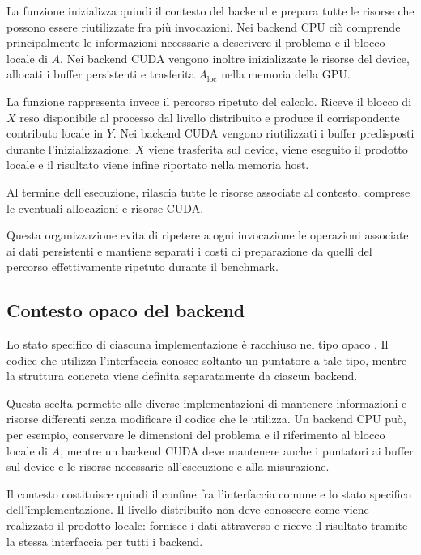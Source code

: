 La funzione  inizializza quindi il contesto del
backend e prepara tutte le risorse che possono essere riutilizzate fra più
invocazioni. Nei backend CPU ciò comprende principalmente le informazioni
necessarie a descrivere il problema e il blocco locale di $A$. Nei backend
CUDA vengono inoltre inizializzate le risorse del device, allocati i buffer
persistenti e trasferita $A_{\mathrm{loc}}$ nella memoria della GPU.

La funzione  rappresenta invece il percorso ripetuto del
calcolo. Riceve il blocco di $X$ reso disponibile al processo dal livello
distribuito e produce il corrispondente contributo locale in $Y$. Nei
backend CUDA vengono riutilizzati i buffer predisposti durante
l'inizializzazione: $X$ viene trasferita sul device, viene eseguito il
prodotto locale e il risultato viene infine riportato nella memoria host.

Al termine dell'esecuzione,  rilascia tutte le
risorse associate al contesto, comprese le eventuali allocazioni e risorse
CUDA.

Questa organizzazione evita di ripetere a ogni invocazione le operazioni
associate ai dati persistenti e mantiene separati i costi di preparazione
da quelli del percorso effettivamente ripetuto durante il benchmark.

\subsection{Contesto opaco del backend}

Lo stato specifico di ciascuna implementazione è racchiuso nel tipo opaco
. Il codice che utilizza l'interfaccia conosce soltanto
un puntatore a tale tipo, mentre la struttura concreta viene definita
separatamente da ciascun backend.

Questa scelta permette alle diverse implementazioni di mantenere
informazioni e risorse differenti senza modificare il codice che le
utilizza. Un backend CPU può, per esempio, conservare le dimensioni del
problema e il riferimento al blocco locale di $A$, mentre un backend CUDA
deve mantenere anche i puntatori ai buffer sul device e le risorse
necessarie all'esecuzione e alla misurazione.

Il contesto costituisce quindi il confine fra l'interfaccia comune e lo
stato specifico dell'implementazione. Il livello distribuito non deve
conoscere come viene realizzato il prodotto locale: fornisce i dati
attraverso  e riceve il risultato tramite la stessa
interfaccia per tutti i backend.

